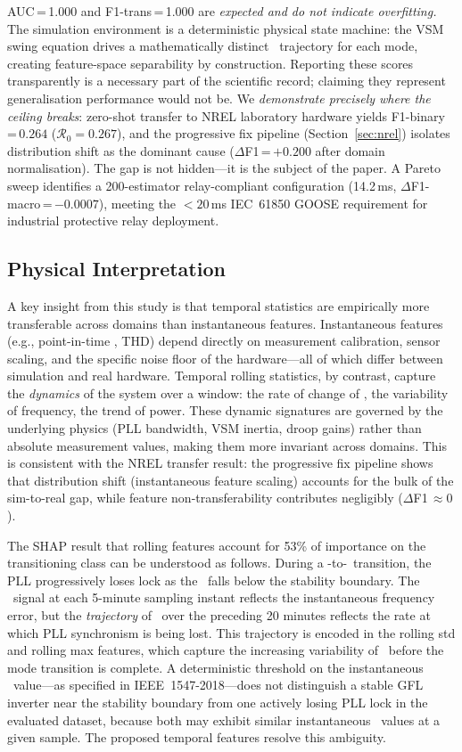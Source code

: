 \documentclass[journal]{IEEEtran}
\newcommand{\rocof}{\text{RoCoF}}
\newcommand{\scr}{\text{SCR}}
\newcommand{\gfl}{\text{GFL}}
\newcommand{\gfm}{\text{GFM}}
\begin{document}
AUC\,=\,1.000 and F1-trans\,=\,1.000 are \emph{expected and do not
indicate overfitting.}
The simulation environment is a deterministic physical state machine:
the VSM swing equation drives a mathematically distinct \rocof\ trajectory
for each mode, creating feature-space separability by construction.
Reporting these scores transparently is a necessary part of the scientific
record; claiming they represent generalisation performance would not be.
We \emph{demonstrate precisely where the ceiling breaks}: zero-shot
transfer to NREL laboratory hardware yields F1-binary\,=\,$0.264$
($\mathcal{R}_0 = 0.267$), and the progressive fix pipeline
(Section~\ref{sec:nrel}) isolates distribution shift as the dominant
cause ($\Delta$F1\,=\,$+0.200$ after domain normalisation).
The gap is not hidden---it is the subject of the paper.
A Pareto sweep identifies a 200-estimator relay-compliant configuration
(14.2\,ms, $\Delta$F1-macro\,=\,$-0.0007$), meeting the $<20$\,ms
IEC~61850 GOOSE requirement for industrial protective relay deployment.

\subsection{Physical Interpretation}

A key insight from this study is that temporal statistics are
empirically more transferable across domains than instantaneous features.
Instantaneous features (e.g., point-in-time \rocof, THD) depend
directly on measurement calibration, sensor scaling, and the specific
noise floor of the hardware---all of which differ between simulation
and real hardware.
Temporal rolling statistics, by contrast, capture the \emph{dynamics}
of the system over a window: the rate of change of \rocof, the
variability of frequency, the trend of power.
These dynamic signatures are governed by the underlying physics
(PLL bandwidth, VSM inertia, droop gains) rather than absolute
measurement values, making them more invariant across domains.
This is consistent with the NREL transfer result:
the progressive fix pipeline shows that distribution shift
(instantaneous feature scaling) accounts for the bulk of the
sim-to-real gap, while feature non-transferability contributes
negligibly ($\Delta$F1\,$\approx 0$).


The SHAP result that rolling features account for 53\% of importance on the
transitioning class can be understood as follows.
During a \gfl-to-\gfm\ transition, the PLL progressively loses lock
as the \scr\ falls below the stability boundary.
The \rocof\ signal at each 5-minute sampling instant reflects the
instantaneous frequency error, but the \emph{trajectory} of
\rocof\ over the preceding 20 minutes reflects the rate at which
PLL synchronism is being lost.
This trajectory is encoded in the rolling std and rolling max features,
which capture the increasing variability of \rocof\ before the mode
transition is complete.
A deterministic threshold on the instantaneous \rocof\ value---as
specified in IEEE~1547-2018---does not distinguish a stable GFL inverter
near the stability boundary from one actively losing PLL lock
in the evaluated dataset, because both may exhibit similar instantaneous \rocof\
values at a given sample.
The proposed temporal features resolve this ambiguity.
\end{document}
